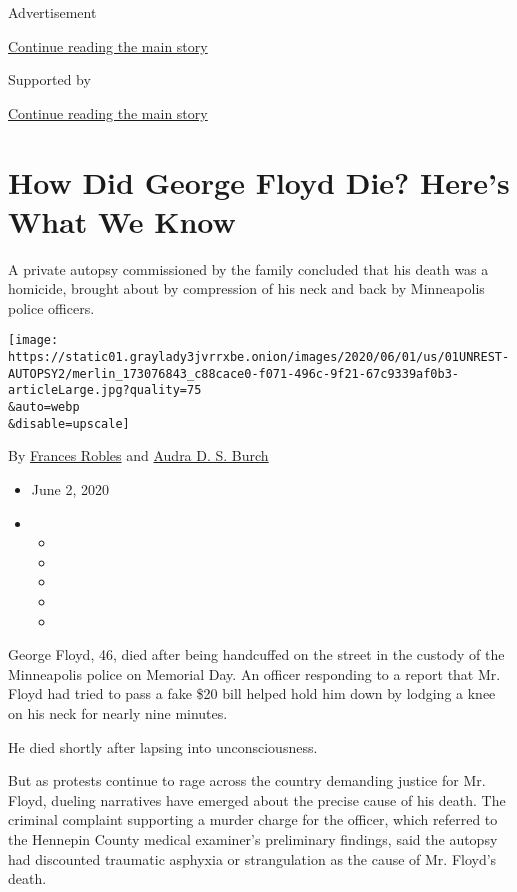 Advertisement

\protect\hyperlink{after-top}{Continue reading the main story}

Supported by

\protect\hyperlink{after-sponsor}{Continue reading the main story}

\hypertarget{how-did-george-floyd-die-heres-what-we-know}{%
\section{How Did George Floyd Die? Here's What We
Know}\label{how-did-george-floyd-die-heres-what-we-know}}

A private autopsy commissioned by the family concluded that his death
was a homicide, brought about by compression of his neck and back by
Minneapolis police officers.

\texttt{[image: https://static01.graylady3jvrrxbe.onion/images/2020/06/01/us/01UNREST-AUTOPSY2/merlin\_173076843\_c88cace0-f071-496c-9f21-67c9339af0b3-articleLarge.jpg?quality=75\\\&auto=webp\\\&disable=upscale]}

By \href{https://www.nytimes3xbfgragh.onion/by/frances-robles}{Frances
Robles} and
\href{https://www.nytimes3xbfgragh.onion/by/audra-d-s-burch}{Audra D. S.
Burch}

\begin{itemize}
\item
  June 2, 2020
\item
  \begin{itemize}
  \item
  \item
  \item
  \item
  \item
  \end{itemize}
\end{itemize}

George Floyd, 46, died after being handcuffed on the street in the
custody of the Minneapolis police on Memorial Day. An officer responding
to a report that Mr. Floyd had tried to pass a fake \$20 bill helped
hold him down by lodging a knee on his neck for nearly nine minutes.

He died shortly after lapsing into unconsciousness.

But as protests continue to rage across the country demanding justice
for Mr. Floyd, dueling narratives have emerged about the precise cause
of his death. The criminal complaint supporting a murder charge for the
officer, which referred to the Hennepin County medical examiner's
preliminary findings, said the autopsy had discounted traumatic asphyxia
or strangulation as the cause of Mr. Floyd's death.

